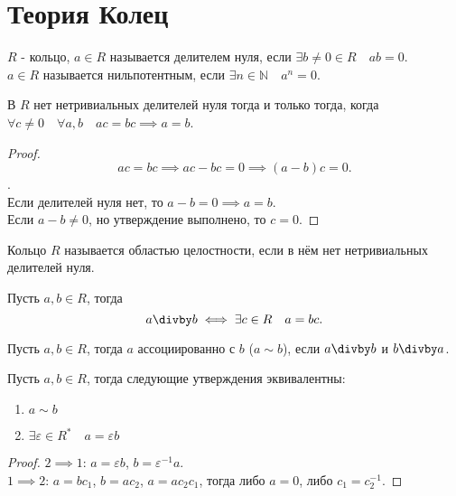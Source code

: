 \documentclass[11pt, oneside]{article}   	%
\begin{document}
\section{Теория Колец}
    \begin{definition}
        $R$ - кольцо, $a\in R$ называется делителем нуля, если $\exists{b \neq 0\in R}\quad ab = 0$.\\
        $a\in R$ называется нильпотентным, если $\exists{n\in \mathbb{N}}\quad a^{n} = 0$.
    \end{definition}
    \begin{dlemma}
        В $R$ нет нетривиальных делителей нуля тогда и только тогда, когда $\forall{c \neq  0}\quad \forall{a, b}\quad  ac=bc \implies a=b$.
        \begin{proof}
            \[ ac=bc \implies ac-bc = 0 \implies (a-b)c = 0 .\].\\
            Если делителей нуля нет, то $a-b=0 \implies a=b$.\\
            Если $a-b \neq 0$, но утверждение выполнено, то $c=0$.
        \end{proof}
    \end{dlemma}
    \begin{definition}
        Кольцо $R$ называется областью целостности, если в нём нет нетривиальных делителей нуля.\\
    \end{definition}
    \begin{definition}
        Пусть $a, b\in R$, тогда
        \[ a\divby b \iff \exists{c\in R}\quad a = bc.\]
    \end{definition}
    \begin{definition}
        Пусть $a, b\in R$, тогда $a$ ассоциированно с $b$ ($a\sim b$), если $a\divby b$ и $b\divby a$.
    \end{definition}
    \begin{dlemma}
        Пусть $a, b\in R$, тогда следующие утверждения эквивалентны:
        \begin{enumerate}
            \item $a\sim b$
            \item  $\exists{\varepsilon\in R^{*}}\quad a = \varepsilon b$
        \end{enumerate}
        \begin{proof}
            $2 \implies 1$: $a = \varepsilon b$, $b = \varepsilon^{-1} a$.\\
            $1 \implies 2$: $a = bc_1$, $b = ac_2$, $a = ac_2c_1$, тогда либо $a=0$, либо $c_1=c_2^{-1}$.
        \end{proof}
    \end{dlemma}
\end{document}
